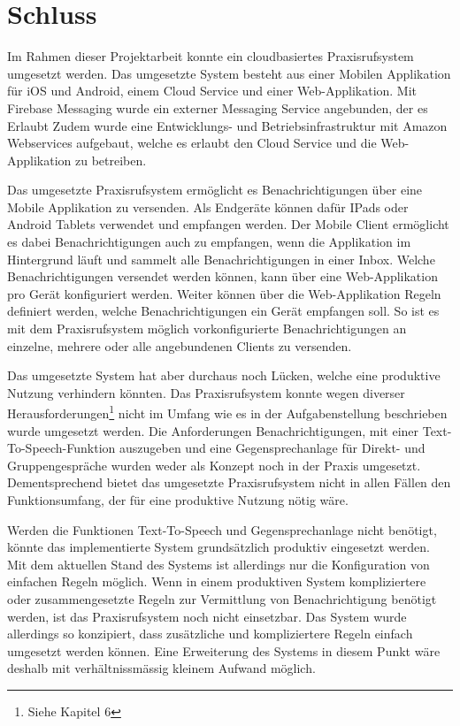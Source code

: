 \section {Schluss}

Im Rahmen dieser Projektarbeit konnte ein cloudbasiertes Praxisrufsystem umgesetzt werden.
Das umgesetzte System besteht aus einer Mobilen Applikation für iOS und Android, einem Cloud Service und einer Web-Applikation.
Mit Firebase Messaging wurde ein externer Messaging Service angebunden, der es Erlaubt
Zudem wurde eine Entwicklungs- und Betriebsinfrastruktur mit Amazon Webservices aufgebaut, welche es erlaubt den Cloud Service und die Web-Applikation zu betreiben.

Das umgesetzte Praxisrufsystem ermöglicht es Benachrichtigungen über eine Mobile Applikation zu versenden.
Als Endgeräte können dafür IPads oder Android Tablets verwendet und empfangen werden.
Der Mobile Client ermöglicht es dabei Benachrichtigungen auch zu empfangen, wenn die Applikation im Hintergrund läuft und sammelt alle Benachrichtigungen in einer Inbox.
Welche Benachrichtigungen versendet werden können, kann über eine Web-Applikation pro Gerät konfiguriert werden.
Weiter können über die Web-Applikation Regeln definiert werden, welche Benachrichtigungen ein Gerät empfangen soll.
So ist es mit dem Praxisrufsystem möglich vorkonfigurierte Benachrichtigungen an einzelne, mehrere oder alle angebundenen Clients zu versenden.

Das umgesetzte System hat aber durchaus noch Lücken, welche eine produktive Nutzung verhindern könnten.
Das Praxisrufsystem konnte wegen diverser Herausforderungen\footnote{Siehe Kapitel 6} nicht im Umfang wie es in der Aufgabenstellung beschrieben wurde umgesetzt werden.
Die Anforderungen Benachrichtigungen, mit einer Text-To-Speech-Funktion auszugeben und eine Gegensprechanlage für Direkt- und Gruppengespräche wurden weder als Konzept noch in der Praxis umgesetzt.
Dementsprechend bietet das umgesetzte Praxisrufsystem nicht in allen Fällen den Funktionsumfang, der für eine produktive Nutzung nötig wäre.

Werden die Funktionen Text-To-Speech und Gegensprechanlage nicht benötigt, könnte das implementierte System grundsätzlich produktiv eingesetzt werden.
Mit dem aktuellen Stand des Systems ist allerdings nur die Konfiguration von einfachen Regeln möglich.
Wenn in einem produktiven System kompliziertere oder zusammengesetzte Regeln zur Vermittlung von Benachrichtigung benötigt werden, ist das Praxisrufsystem noch nicht einsetzbar.
Das System wurde allerdings so konzipiert, dass zusätzliche und kompliziertere Regeln einfach umgesetzt werden können.
Eine Erweiterung des Systems in diesem Punkt wäre deshalb mit verhältnissmässig kleinem Aufwand möglich.

